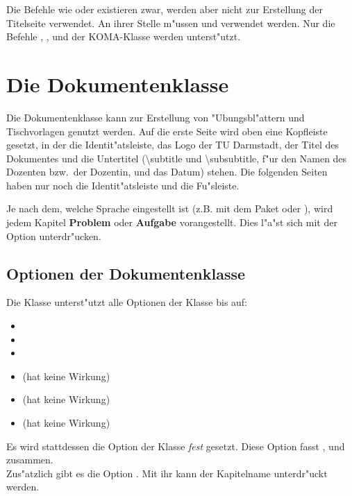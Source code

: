 \documentclass[twoside,colorback,accentcolor=tud4c,11pt]{tudreport}
\begin{document}
    Die Befehle wie  oder 
    existieren zwar, werden aber nicht zur Erstellung der Titelseite
    verwendet. An ihrer Stelle
    m"ussen  und 
    verwendet werden. Nur die Befehle ,
    ,  
    und  der KOMA-Klasse  werden
    unterst"utzt.

\chapter{Die Dokumentenklasse \texorpdfstring{}{tudexercise}}\label{chap:tudexercise}
  
  Die Dokumentenklasse  kann zur Erstellung von
  "Ubungsbl"attern und Tischvorlagen genutzt werden. Auf die erste Seite wird oben eine
  Kopfleiste gesetzt, in der die Identit"atsleiste, das Logo der TU Darmstadt, der
  Titel des Dokumentes und die Untertitel (\textbackslash subtitle und
  \textbackslash subsubtitle, f"ur den Namen des Dozenten bzw.\ der Dozentin,
  und das Datum) stehen. Die folgenden Seiten haben nur noch die
  Identit"atsleiste und die Fu"sleiste.
  
  Je nach dem, welche Sprache eingestellt ist (z.B. mit dem Paket  oder
  ), wird jedem Kapitel \textbf{Problem} oder \textbf{Aufgabe} vorangestellt.
  Dies l"a"st sich mit der Option  unterdr"ucken.

  \section{Optionen der Dokumentenklasse \texorpdfstring{}{tudexercise}}

  Die Klasse  unterst"utzt alle Optionen der
   Klasse bis auf:
  \begin{itemize}\itemsep-0.5ex
     \item {}
     \item {}
     \item {}
     \item {} (hat keine Wirkung)
     \item {} (hat keine Wirkung)
     \item {} (hat keine Wirkung)
  \end{itemize}
  Es wird stattdessen die Option  der Klasse
   \emph{fest} gesetzt. Diese Option fasst ,
   und  zusammen.\\[0.5\baselineskip]
  Zus"atzlich gibt es die Option . Mit ihr kann der Kapitelname unterdr"uckt
  werden.
        
\end{document}

